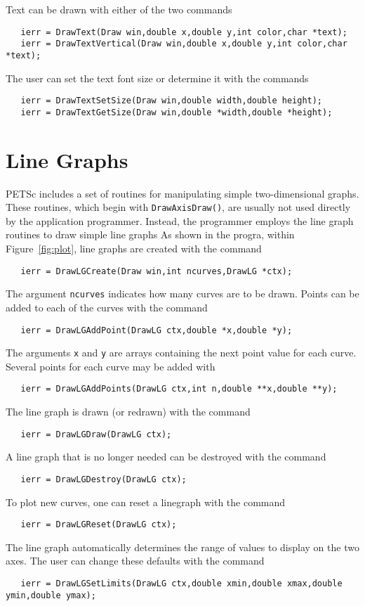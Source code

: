 Text can be drawn with either of the two 
commands  
\begin{verbatim}
   ierr = DrawText(Draw win,double x,double y,int color,char *text);
   ierr = DrawTextVertical(Draw win,double x,double y,int color,char *text);
\end{verbatim}
The user can set the text font size or determine it with the 
commands  
\begin{verbatim}
   ierr = DrawTextSetSize(Draw win,double width,double height);
   ierr = DrawTextGetSize(Draw win,double *width,double *height);
\end{verbatim}

\section{Line Graphs}
PETSc includes a set of routines for manipulating simple two-dimensional
graphs. These routines, which begin with {\tt DrawAxisDraw()}, are usually 
not used directly by the application programmer.  Instead, the programmer 
employs the line graph routines to draw simple line graphs
As shown in the progra, within Figure~\ref{fig:plot}, line graphs 
are created with the command  
\begin{verbatim}
   ierr = DrawLGCreate(Draw win,int ncurves,DrawLG *ctx);
\end{verbatim}
The argument {\tt ncurves} indicates how many curves are to be drawn.
Points can be added to each of the curves with the 
command 
\begin{verbatim}
   ierr = DrawLGAddPoint(DrawLG ctx,double *x,double *y);
\end{verbatim}
The arguments {\tt x} and {\tt y} are arrays containing the next 
point value for each curve.
Several points for each curve may be added with 
\begin{verbatim}
   ierr = DrawLGAddPoints(DrawLG ctx,int n,double **x,double **y);
\end{verbatim}

The line graph is drawn (or redrawn) with the command 
\begin{verbatim}
   ierr = DrawLGDraw(DrawLG ctx);
\end{verbatim}
A line graph that is no longer needed can be destroyed with the 
command 
\begin{verbatim}
   ierr = DrawLGDestroy(DrawLG ctx);
\end{verbatim}
To plot new curves, one can reset a linegraph with the
command 
\begin{verbatim}
   ierr = DrawLGReset(DrawLG ctx);
\end{verbatim}
The line graph automatically determines the range of values to 
display on the two axes.  The user can change these defaults with the 
command 
\begin{verbatim}
   ierr = DrawLGSetLimits(DrawLG ctx,double xmin,double xmax,double ymin,double ymax);
\end{verbatim}

